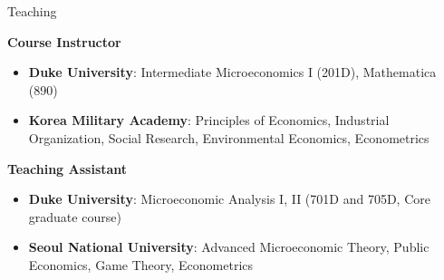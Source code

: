 \begin{rSection}{Teaching}


\textbf{Course Instructor}	
\begin{itemize}
	\item[] \textbf{Duke University}: Intermediate Microeconomics I (201D), Mathematica (890)
	\item[] \textbf{Korea Military Academy}: Principles of Economics, Industrial Organization, Social Research, Environmental Economics, Econometrics 
\end{itemize}

\textbf{Teaching Assistant}
\begin{itemize}
	\item[] \textbf{Duke University}: Microeconomic Analysis I, II (701D and 705D, Core graduate course) 
	\item[] \textbf{Seoul National University}: Advanced Microeconomic Theory, Public Economics, Game Theory, Econometrics
\end{itemize}


\begin{comment}
	\textbf{Duke University} \hfill { \textbf{Teaching Assistant}}
	
	\hspace*{20pt}	Microeconomic Analysis I, II (Graduate Level) 
	
	\smallskip
	\textbf{Korea Military Academy} \hfill { \textbf{Lecturer}}
	
	\hspace*{20pt} Principles of Economics,
	Industrial Organization,
	Social Research,
	
	\hspace*{20pt}		Environmental Economics,
	Econometrics 
	
	\smallskip
	\textbf{Seoul National University} \hfill {\textbf{Teaching Assistant} }
	
	\hspace*{20pt} Advanced Microeconomic Theory,
	Public Economics, 
	Game Theory, 
	Econometrics 
\end{comment}




\end{rSection}